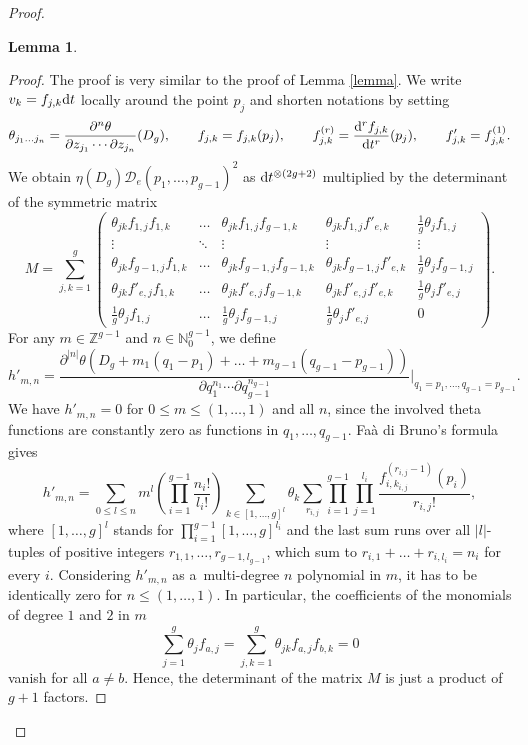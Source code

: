 \documentclass[pdftex]{sigma}
\numberwithin{equation}{section}
\newtheorem{Lemma}[Theorem]{Lemma}
\begin{document}
\begin{proof}
\begin{Lemma}
	\end{Lemma}
	\begin{proof}
		The proof is very similar to the proof of Lemma \ref{lemma}.
		We write $v_k=f_{j,k}{\rm d}t$ locally around the point $p_j$ and shorten notations by setting
		\[
\theta_{j_1\dots j_n}=\frac{\partial^n\theta}{\partial z_{j_1}\cdots \partial z_{j_n}} (D_g),\qquad f_{j,k}=f_{j,k}(p_j),\qquad f^{(r)}_{j,k}=\frac{{\rm d}^rf_{j,k}}{{\rm d}t^r}(p_j), \qquad f'_{j,k}=f^{(1)}_{j,k}.\]
		We obtain $\eta(D_g)\mathscr{D}_e(p_1,\dots,p_{g-1})^2$ as ${\rm d}t^{\otimes(2g+2)}$ multiplied by the determinant of the symmetric matrix
		\[M=\sum_{j,k=1}^g\begin{pmatrix}\theta_{jk}f_{1,j} f_{1,k} & \dots & \theta_{jk}f_{1,j} f_{g-1,k} & \theta_{jk}f_{1,j} f'_{e,k} & \frac{1}{g}\theta_j f_{1,j}\\
			\vdots&\ddots&\vdots&\vdots&\vdots\\
			\theta_{jk}f_{g-1,j} f_{1,k} & \dots &\theta_{jk}f_{g-1,j}f_{g-1,k}&\theta_{jk}f_{g-1,j}f'_{e,k}& \frac{1}{g}\theta_j f_{g-1,j}\\
			\theta_{jk}f'_{e,j}f_{1,k}&\dots&\theta_{jk}f'_{e,j}f_{g-1,k}&\theta_{jk}f'_{e,j}f'_{e,k}&\frac{1}{g}\theta_j f'_{e,j}\\
			\frac{1}{g}\theta_{j} f_{1,j} & \dots & \frac{1}{g}\theta_{j}f_{g-1,j} &\frac{1}{g}\theta_{j}f'_{e,j}& 0\end{pmatrix}.\]
		For any $m\in\mathbb{Z}^{g-1}$ and $n\in \mathbb{N}_0^{g-1}$, we define
		\[h'_{m,n}=\frac{\partial^{|n|}\theta(D_g+m_1(q_1-p_1)+\dots+m_{g-1}(q_{g-1}-p_{g-1}))}{\partial q_1^{n_1}\cdots\partial q_{g-1}^{n_{g-1}}}\Big|_{q_1=p_1,\dots,q_{g-1}=p_{g-1}}.\]
		We have $h'_{m,n}=0$ for $0\le m\le (1,\dots,1)$ and all $n$, since the involved theta functions are constantly zero as functions in $q_1,\dots,q_{g-1}$. Fa\`a di Bruno's formula gives
		\[h'_{m,n}=\sum_{0\le l\le n} m^l\left(\prod_{i=1}^{g-1}\frac{n_i!}{l_i!}\right)\sum_{k\in [1,\dots,g]^{l}}\theta_k\sum_{r_{i,j}}\prod_{i=1}^{g-1}\prod_{j=1}^{l_i}\frac{f_{i,k_{i,j}}^{(r_{i,j}-1)}(p_i)}{r_{i,j}!},\]
		where $[1,\dots,g]^{l}$ stands for $\prod_{i=1}^{g-1} [1,\dots,g]^{l_i}$ and the last sum runs over all $|l|$-tuples of positive integers $r_{1,1},\dots,r_{g-1,l_{g-1}}$, which sum to $r_{i,1}+\dots+r_{i,l_i}=n_i$ for every $i$. Considering $h'_{m,n}$ as a~multi-degree $n$ polynomial in $m$, it has to be identically zero for $n\le (1,\dots,1)$. In particular, the coefficients of the monomials of degree $1$ and $2$ in $m$
		\[\sum_{j=1}^g\theta_j f_{a,j}=\sum_{j,k=1}^g \theta_{jk}f_{a,j}f_{b,k}=0\]
		vanish for all $a\neq b$. Hence, the determinant of the matrix $M$ is just a product of $g+1$ factors.
		

\end{proof}
\end{proof}
\end{document}
